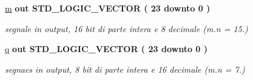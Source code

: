 \begin{DoxyCompactItemize}
\hyperlink{group___linear_regression_gad943f01112876248a4734aa3c3d2e3f2}{m}  {\bfseries {\bfseries \textcolor{vhdlchar}{out}\textcolor{vhdlchar}{ }}} {\bfseries \textcolor{vhdlchar}{S\+T\+D\+\_\+\+L\+O\+G\+I\+C\+\_\+\+V\+E\+C\+T\+OR}\textcolor{vhdlchar}{ }\textcolor{vhdlchar}{(}\textcolor{vhdlchar}{ }\textcolor{vhdlchar}{ } \textcolor{vhdldigit}{23} \textcolor{vhdlchar}{ }\textcolor{vhdlchar}{downto}\textcolor{vhdlchar}{ }\textcolor{vhdlchar}{ } \textcolor{vhdldigit}{0} \textcolor{vhdlchar}{ }\textcolor{vhdlchar}{)}\textcolor{vhdlchar}{ }} 
\begin{DoxyCompactList}\small\item\em segnale in output, 16 bit di parte intera e 8 decimale (m.\+n = 15.) \end{DoxyCompactList}\item 
\hyperlink{group___linear_regression_gacec4f4b6d139d1ada088ca2d3d881418}{q}  {\bfseries {\bfseries \textcolor{vhdlchar}{out}\textcolor{vhdlchar}{ }}} {\bfseries \textcolor{vhdlchar}{S\+T\+D\+\_\+\+L\+O\+G\+I\+C\+\_\+\+V\+E\+C\+T\+OR}\textcolor{vhdlchar}{ }\textcolor{vhdlchar}{(}\textcolor{vhdlchar}{ }\textcolor{vhdlchar}{ } \textcolor{vhdldigit}{23} \textcolor{vhdlchar}{ }\textcolor{vhdlchar}{downto}\textcolor{vhdlchar}{ }\textcolor{vhdlchar}{ } \textcolor{vhdldigit}{0} \textcolor{vhdlchar}{ }\textcolor{vhdlchar}{)}\textcolor{vhdlchar}{ }} 
\begin{DoxyCompactList}\small\item\em segnaes in output, 8 bit di parte intera e 16 decimale (m.\+n = 7.) \end{DoxyCompactList}\end{DoxyCompactItemize}
